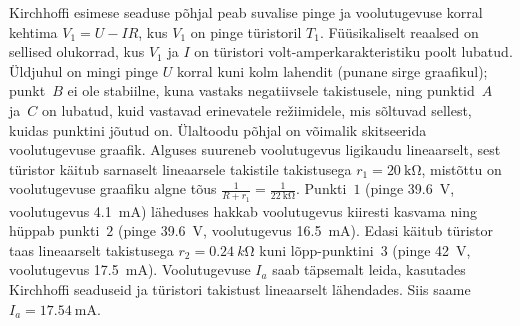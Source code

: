 \documentclass[11pt]{article}
\begin{document}
{{\begin{figure}[h]
\begin{center}
\begin{tikzpicture}[scale=1.4,
axes/.style=]
\end{tikzpicture}
\end{center}
\end{figure}
Kirchhoffi esimese seaduse põhjal peab suvalise pinge ja voolutugevuse korral kehtima $V_1 = U - IR$, kus $V_1$ on pinge türistoril $T_1$. Füüsikaliselt reaalsed on sellised olukorrad, kus $V_1$ ja $I$ on türistori volt-amperkarakteristiku poolt lubatud. Üldjuhul on mingi pinge $U$ korral kuni kolm lahendit (punane sirge graafikul); punkt~$B$ ei ole stabiilne, kuna vastaks negatiivsele takistusele, ning punktid~$A$ ja~$C$ on lubatud, kuid vastavad erinevatele režiimidele, mis sõltuvad sellest, kuidas punktini jõutud on. Ülaltoodu põhjal on võimalik skitseerida voolutugevuse graafik. Alguses suureneb voolutugevus ligikaudu lineaarselt, sest türistor käitub sarnaselt lineaarsele takistile takistusega $r_1=\SI{20}{\kilo\ohm}$, mistõttu on voolutugevuse graafiku algne tõus $\frac{1}{R + r_1}=\frac{1}{\SI{22}{\kilo\ohm}}$. Punkti~$1$ (pinge \SI{39.6}{\volt}, voolutugevus \SI{4.1}{\milli\ampere}) läheduses hakkab voolutugevus kiiresti kasvama ning hüppab punkti~$2$ (pinge \SI{39.6}{\volt}, voolutugevus \SI{16.5}{\milli\ampere}). Edasi käitub türistor taas lineaarselt takistusega $r_2=\SI{0.24}{k\ohm}$ kuni lõpp-punktini~$3$ (pinge \SI{42}{\volt}, voolutugevus \SI{17.5}{\milli\ampere}). Voolutugevuse $I_a$ saab täpsemalt leida, kasutades Kirchhoffi seaduseid ja türistori takistust lineaarselt lähendades. Siis saame $I_a = \SI{17.54}{\milli\ampere}$.

\begin{figure}[h]
\begin{center}
\end{center}
\end{figure}}}
\end{document}
